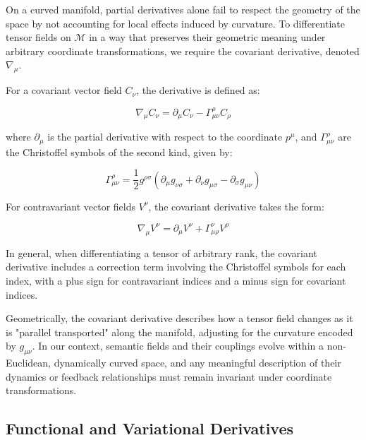 On a curved manifold, partial derivatives alone fail to respect the geometry of the space by not accounting for local effects induced by curvature. To differentiate tensor fields on \(\mathcal{M}\) in a way that preserves their geometric meaning under arbitrary coordinate transformations, we require the covariant derivative, denoted \(\nabla_\mu\).

For a covariant vector field \(C_\nu\), the derivative is defined as:

\begin{equation}
\nabla_\mu C_\nu = \partial_\mu C_\nu - \Gamma^\rho_{\mu\nu} C_\rho
\end{equation}

where \(\partial_\mu\) is the partial derivative with respect to the coordinate \(p^\mu\), and \(\Gamma^\rho_{\mu\nu}\) are the Christoffel symbols \autocite{Christoffel1869} of the second kind, given by:

\begin{equation}
\Gamma^\rho_{\mu\nu} = \frac{1}{2} g^{\rho\sigma} \left( \partial_\mu g_{\nu\sigma} + \partial_\nu g_{\mu\sigma} - \partial_\sigma g_{\mu\nu} \right)
\end{equation}

For contravariant vector fields \(V^\nu\), the covariant derivative takes the form:

\begin{equation}
\nabla_\mu V^\nu = \partial_\mu V^\nu + \Gamma^\nu_{\mu\rho} V^\rho
\end{equation}

In general, when differentiating a tensor of arbitrary rank, the covariant derivative includes a correction term involving the Christoffel symbols for each index, with a plus sign for contravariant indices and a minus sign for covariant indices.

Geometrically, the covariant derivative describes how a tensor field changes as it is "parallel transported" along the manifold, adjusting for the curvature encoded by \(g_{\mu\nu}\). In our context, semantic fields and their couplings evolve within a non-Euclidean, dynamically curved space, and any meaningful description of their dynamics or feedback relationships must remain invariant under coordinate transformations.


\subsection{Functional and Variational Derivatives}
\label{2.4.4:functional_and_variational_derivatives}

